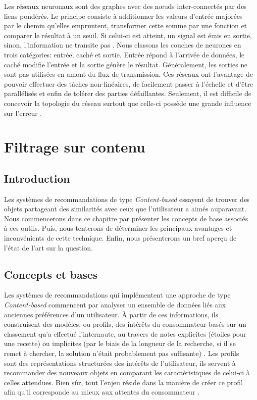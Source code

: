 Les réseaux neuronaux sont des graphes avec des nœuds inter-connectés par des liens pondérés. Le principe consiste à additionner les valeurs d'entrée majorées par le chemin qu'elles empruntent, transformer cette somme par une fonction et comparer le résultat à un seuil. Si celui-ci est atteint, un signal est émis en sortie, sinon, l'information ne transite pas \cite{rosenblatt1958perceptron}. Nous classons les couches de neurones en trois catégories: entrée, caché et sortie. Entrée répond à l'arrivée de données, le caché modifie l'entrée et la sortie génère le résultat. Généralement, les sorties ne sont pas utilisées en amont du flux de transmission. Ces réseaux ont l'avantage de pouvoir effectuer des tâches non-linéaires, de facilement passer à l'échelle et d'être parallélisés et enfin de tolérer des parties défaillantes. Seulement, il est difficile de concevoir la topologie du réseau surtout que celle-ci possède une grande influence sur l'erreur \cite{pazzani1997learning}.

\section{Filtrage sur contenu}

\subsection{Introduction}

Les systèmes de recommandations de type \textit{Content-based} essayent de trouver des objets partageant des similarités avec ceux que l'utilisateur a aimés auparavant. Nous commencerons dans ce chapitre par présenter les concepts de base associés à ces outils. Puis, nous tenterons de déterminer les principaux avantages et inconvénients de cette technique. Enfin, nous présenterons un bref aperçu de l'état de l'art sur la question.

\subsection{Concepts et bases}

Les systèmes de recommandations qui implémentent une approche de type \textit{Content-based} commencent par analyser un ensemble de données liés aux anciennes préférences d'un utilisateur. À partir de ces informations, ils construisent des modèles, ou profils, des intérêts du consommateur basés sur un classement qu'a effectué l'internaute, au travers de notes explicites (étoiles pour une recette) ou implicites (par le biais de la longueur de la recherche, si il se remet à chercher, la solution n'était probablement pas suffisante) \cite{oard1998implicit}. Les profils sont des représentations structurées des intérêts de l'utilisateur, ils servent à recommander des nouveaux objets en comparant les caractéristiques de celui-ci à celles attendues. Bien sûr, tout l'enjeu réside dans la manière de créer ce profil afin qu'il corresponde au mieux aux attentes du consommateur \cite{balabanovic1997fab}.

